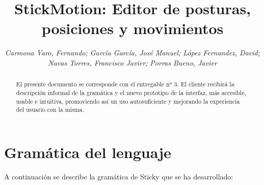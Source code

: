 \documentclass[a4paper,12pt]{article}
\title{\textbf{StickMotion:} Editor de posturas, posiciones y movimientos}
\author{\small\textit{Carmona Varo, Fernando; García García, José Manuel; López Fernandez, David;}\\
	\small\textit{Navas Torres, Francisco Javier; Porras Bueno, Javier}}
\begin{document}
  \maketitle %

  \begin{abstract}
    El presente documento se corresponde con el entregable nº 3. El cliente recibirá la descripción informal de la gramática y el nuevo prototipo de la
    interfaz, más accesible, usable e intuitiva, promoviendo así un uso autosuficiente y mejorando la experiencia del usuario con la misma.\\
  \end{abstract}

  \section{Gramática del lenguaje}
  A continuación se describe la gramática de Sticky que se ha desarrollado:
\end{document}
